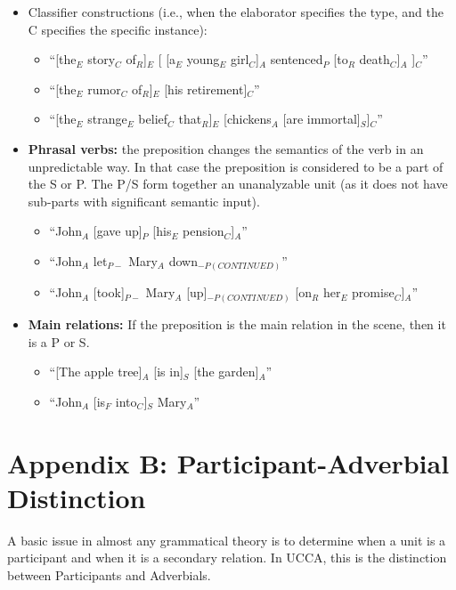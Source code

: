 \documentclass[11pt]{article}
\begin{document}
\begin{enumerate}
\begin{itemize}
\item
Classifier constructions (i.e., when the elaborator specifies the type, and the C specifies the specific instance):

\begin{itemize}
\item
``[the$_E$ story$_C$ of$_R$]$_E$ [ [a$_E$ young$_E$ girl$_C$]$_A$ sentenced$_P$ [to$_R$ death$_C$]$_A$ ]$_C$''
\item
``[the$_E$ rumor$_C$ of$_R$]$_E$ [his retirement]$_C$''
\item
``[the$_E$ strange$_E$ belief$_C$ that$_R$]$_E$ [chickens$_A$ [are immortal]$_S$]$_C$''
\end{itemize}

\item
{\bf Phrasal verbs:} the preposition changes the semantics of the verb in an unpredictable way. In that case the preposition is considered to be a part of the S or P. The P/S form together an unanalyzable unit (as it does not have sub-parts with significant semantic input).

\begin{itemize}
\item
``John$_A$ [gave up]$_P$ [his$_E$ pension$_C$]$_A$''
\item
``John$_A$ let$_{P-}$ Mary$_A$ down$_{-P(CONTINUED)}$''
\item
``John$_A$ [took]$_{P-}$ Mary$_A$ [up]$_{-P(CONTINUED)}$ [on$_R$ her$_E$ promise$_C$]$_A$''
\end{itemize}

\item
{\bf Main relations:} If the preposition is the main relation in the scene, then it is a P or S.

\begin{itemize}
\item
``[The apple tree]$_A$ [is in]$_S$ [the garden]$_A$''
\item
``John$_A$ [is$_F$ into$_C$]$_S$ Mary$_A$''
\end{itemize}


\end{itemize}

\end{enumerate}

\section*{\large Appendix B: Participant-Adverbial Distinction}

A basic issue in almost any grammatical theory is to determine when a unit is a participant and when it is a secondary relation. In UCCA, this is the distinction between Participants and Adverbials.
\end{document}
